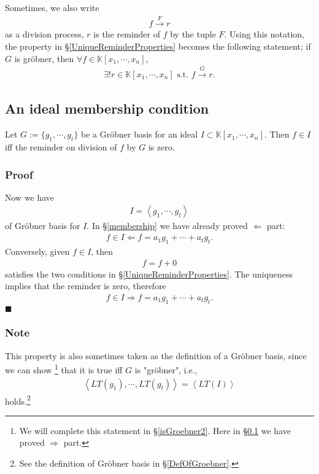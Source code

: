 \documentclass[11pt]{book}
\begin{document}
Sometimes, we also write
\begin{eqnarray}
f \stackrel{F}{\to} r %
\end{eqnarray}
as a division process, $r$ is the reminder of $f$ by the tuple $F$.
Using this notation, the property in \S\ref{UniqueReminderProperties} becomes the following statement; if $G$ is gr\"obner, then $\forall f \in \mathbb{K}[x_1, \cdots, x_n]$,
\begin{eqnarray}
\exists! r \in \mathbb{K}[x_1, \cdots, x_n] \text{ s.t. } f \stackrel{G}{\to} r.
\end{eqnarray}

\subsection{An ideal membership condition}
\label{IMC}
Let $G := \{g_1, \cdots, g_t\} $ be a Gr\"obner basis for an ideal $I \subset \mathbb{K}[x_1, \cdots, x_n]$.
Then $f \in I$ iff the reminder on division of $f$ by $G$ is zero.

\subsubsection{Proof}
Now we have
\begin{eqnarray}
I = \left< g_1, \cdots, g_t\right>
\end{eqnarray}
of Gr\"obner basis for $I$.
In \S\ref{membership} we have already proved $\Leftarrow$ part:
\begin{eqnarray}
f \in I \Leftarrow f = a_1 g_1 + \cdots + a_t g_t.
\end{eqnarray}
Conversely, given $f \in I$, then
\begin{eqnarray}
f = f+0
\end{eqnarray}
satisfies the two conditions in \S\ref{UniqueReminderProperties}.
The uniqueness implies that the reminder is zero, therefore
\begin{eqnarray}
f \in I \Rightarrow f = a_1 g_1 + \cdots + a_t g_t.
\end{eqnarray}
$\blacksquare$

\subsubsection{Note}
This property is also sometimes taken as the definition of a Gr\"obner basis, since we can show \footnote{We will complete this statement in \S\ref{isGroebner2}.
Here in \S\ref{IMC} we have proved $\Rightarrow$ part.
} that it is true iff $G$ is "gr\"obner", i.e.,
\begin{eqnarray}
\left< LT(g_1), \cdots, LT(g_t) \right> = \left< LT(I)\right>
\end{eqnarray}
holds.\footnote{See the definition of Gr\"obner basis in \S\ref{DefOfGroebner}.}
\end{document}
